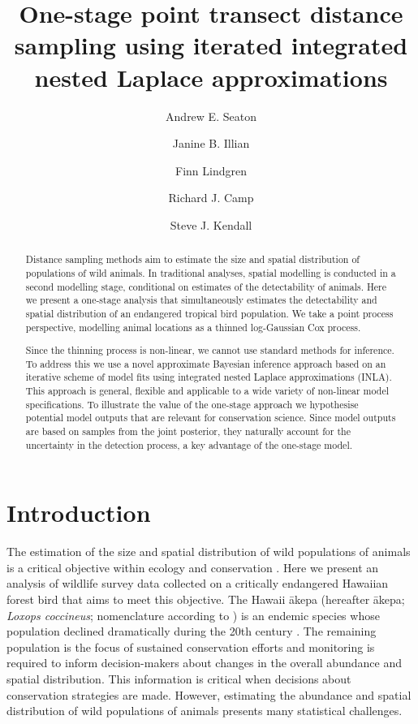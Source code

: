 \documentclass{statsoc}
\title[One-stage point transect distance sampling using iterated INLA]{One-stage point transect distance sampling using iterated integrated nested Laplace approximations}
\author[Andrew E. Seaton {\it et al.}]{Andrew E. Seaton}
\author{Janine B. Illian}
\author{Finn Lindgren}
\author{Richard J. Camp}
\author[Andrew E. Seaton \textit{et al.}]{Steve J. Kendall}
\newcommand{\akepa}{\textquotesingle\={a}kepa}  %
\newcommand{\hawaii}{Hawai\textquotesingle i}   %
\begin{document}
\begin{abstract}
Distance sampling methods aim to estimate the size and spatial distribution of populations of wild animals.  In traditional analyses, spatial modelling is conducted in a second modelling stage, conditional on estimates of the detectability of animals. Here we present a one-stage analysis that simultaneously estimates the detectability and spatial distribution of an endangered tropical bird population.  We take a point process perspective, modelling animal locations as a thinned log-Gaussian Cox process.

Since the thinning process is non-linear, we cannot use standard methods for inference. To address this we use a novel approximate Bayesian inference approach based on an iterative scheme of model fits using integrated nested Laplace approximations (INLA).  This approach is general, flexible and applicable to a wide variety of non-linear model specifications. To illustrate the value of the one-stage approach we hypothesise potential model outputs that are relevant for conservation science.  Since model outputs are based on samples from the joint posterior, they naturally account for the uncertainty in the detection process, a key advantage of the one-stage model. 

\end{abstract}


\section{Introduction}

The estimation of the size and spatial distribution of wild populations of animals is a critical objective within ecology and conservation \citep{schwarz_estimating_1999}. Here we present an analysis of wildlife survey data collected on a critically endangered Hawaiian forest bird that aims to meet this objective.  The \hawaii{} \akepa{} (hereafter \akepa{}; \textit{Loxops coccineus}; nomenclature according to \citealp{usfws_akepa_1970}) is an endemic species whose population declined dramatically during the 20th century  \citep{usfws_revised_2006, judge_akepa_2018}.  The remaining population is the focus of sustained conservation efforts and monitoring is required to inform decision-makers about changes in the overall abundance and spatial distribution.  This information is critical when decisions about conservation strategies are made.  However, estimating the abundance and spatial distribution of wild populations of animals presents many statistical challenges.
\end{document}
